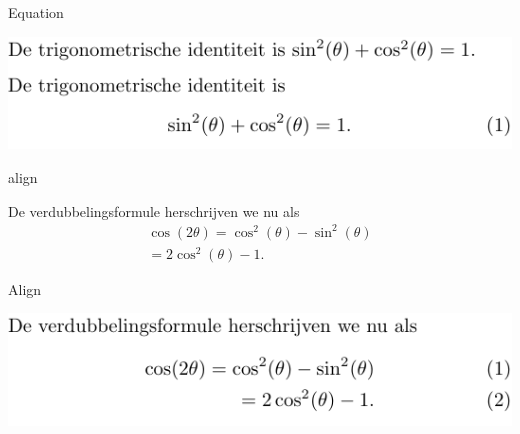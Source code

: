 \documentclass[presentatie.tex]{subfiles}
\begin{document}

\begin{frame}{Equation}


	\includegraphics[width=\linewidth,height=0.4\textheight,keepaspectratio]{assets/5_Formules/mathEquation.pdf}

\end{frame}


\begin{saveblock}{align}
	\begin{highlightblock}[gobble=8,linewidth=\textwidth,
		framexleftmargin=0.25em,xleftmargin=0.25em]
		De verdubbelingsformule herschrijven we nu als
		\begin{align}
			\cos(2\theta) = \cos^2(\theta) - \sin^2(\theta)\\
			= 2\cos^2(\theta)-1.
		\end{align}
	\end{highlightblock}
\end{saveblock}


\begin{frame}{Align}

	\includegraphics[width=\linewidth,height=0.4\textheight,keepaspectratio]{assets/5_Formules/mathAlignUnaligned.pdf}
\end{frame}
\end{document}
